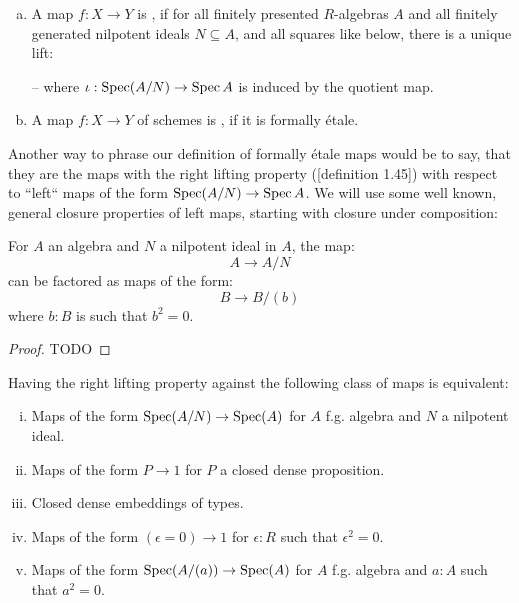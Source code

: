 \begin{definition}
  \begin{enumerate}[(a)]
  \item   A map $f:X\to Y$ is ,
    if for all finitely presented $R$-algebras $A$ and all finitely generated nilpotent ideals $N\subseteq A$,
    and all squares like below, there is a unique lift:
    \begin{center}
    \end{center}
    -- where $\iota:\operatorname{Spec} (A/N)\to \operatorname{Spec} A$ is induced by the quotient map.
  \item A map $f:X\to Y$ of schemes is , if it is formally étale.
  \end{enumerate}
\end{definition}

Another way to phrase our definition of formally étale maps would be to say,
that they are the maps with the right lifting property (\cite{modalities}[definition 1.45]) with respect to ``left`` maps of the form $\operatorname{Spec} (A/N)\to \operatorname{Spec} A$.
We will use some well known, general closure properties of left maps, starting with closure under composition:

\begin{lemma}%
\label{decomposition-nilpotent}
For $A$ an algebra and $N$ a nilpotent ideal in $A$, the map:
\[A
\to A/N
\] 
can be factored as maps of the form:
\[
B\to B/(b)
\]
where $b:B$ is such that $b^2=0$.
\end{lemma}

\begin{proof}
TODO
\end{proof}

\begin{lemma}
\label{equivalence-etale}
Having the right lifting property against the following class of maps is equivalent:
\begin{enumerate}[(i)]
\item Maps of the form $\operatorname{Spec}(A/N)\to \operatorname{Spec}(A)$ for $A$ f.g. algebra and $N$ a nilpotent ideal.
\item Maps of the form $P\to 1$ for $P$ a closed dense proposition.
\item Closed dense embeddings of types.
\item Maps of the form $(\epsilon=0)\to 1$ for $\epsilon:R$ such that $\epsilon^2=0$.
\item Maps of the form $\operatorname{Spec}(A/(a)) \to \operatorname{Spec}(A)$ for $A$ f.g. algebra and $a:A$ such that $a^2=0$.
\end{enumerate}
\end{lemma}

